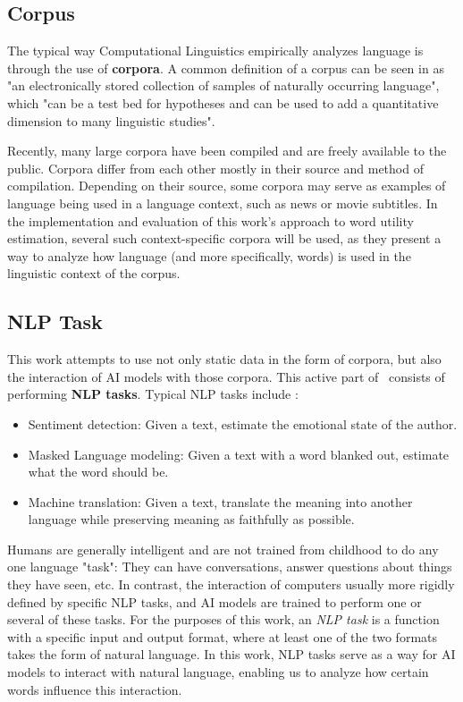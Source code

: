 \subsection{Corpus}
The typical way Computational Linguistics empirically analyzes language is through the use of \textbf{corpora}.
A common definition of a corpus can be seen in  as "an electronically stored collection of samples of naturally occurring language", which "can be a test bed for hypotheses and can be used to add a quantitative dimension to many linguistic studies".

Recently, many large corpora have been compiled and are freely available to the public.
Corpora differ from each other mostly in their source and method of compilation.
Depending on their source, some corpora may serve as examples of language being used in a language context, such as news or movie subtitles.
In the implementation and evaluation of this work's approach to word utility estimation, several such context-specific corpora will be used, as they present a way to analyze how language (and more specifically, words) is used in the linguistic context of the corpus.

\subsection{NLP Task}
This work attempts to use not only static data in the form of corpora, but also the interaction of AI models with those corpora.
This active part of \NLP\ consists of performing \textbf{NLP tasks}.
Typical NLP tasks include :

\begin{itemize}
	\item Sentiment detection: Given a text, estimate the emotional state of the author.
	\item Masked Language modeling: Given a text with a word blanked out, estimate what the word should be.
	\item Machine translation: Given a text, translate the meaning into another language while preserving meaning as faithfully as possible.
\end{itemize}


Humans are generally intelligent and are not trained from childhood to do any one language "task":
They can have conversations, answer questions about things they have seen, etc.
In contrast, the interaction of computers usually more rigidly defined by specific NLP tasks, and AI models are trained to perform one or several of these tasks.
For the purposes of this work, an \textit{NLP task} is a function with a specific input and output format, where at least one of the two formats takes the form of natural language.
In this work, NLP tasks serve as a way for AI models to interact with natural language, enabling us to analyze how certain words influence this interaction.


